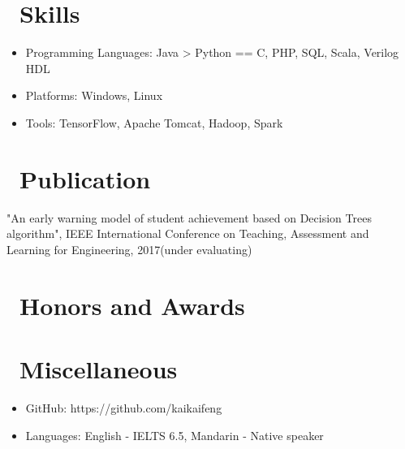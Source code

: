 \documentclass{resume}
\begin{document}

\section{\faCogs\ Skills}
\begin{itemize}[parsep=0.5ex]
  \item Programming Languages: Java > Python == C, PHP, SQL, Scala, Verilog HDL
  \item Platforms: Windows, Linux
  \item Tools: TensorFlow, Apache Tomcat, Hadoop, Spark
\end{itemize}

\section{\faFolder\ Publication}
"An early warning model of student achievement based on Decision Trees algorithm", IEEE International Conference on Teaching, Assessment and Learning for Engineering, 2017(under evaluating)

\section{\faHeartO\ Honors and Awards}

\section{\faInfo\ Miscellaneous}
\begin{itemize}[parsep=0.5ex]
  \item GitHub: https://github.com/kaikaifeng
  \item Languages: English - IELTS 6.5, Mandarin - Native speaker
\end{itemize}

%
%
\end{document}
